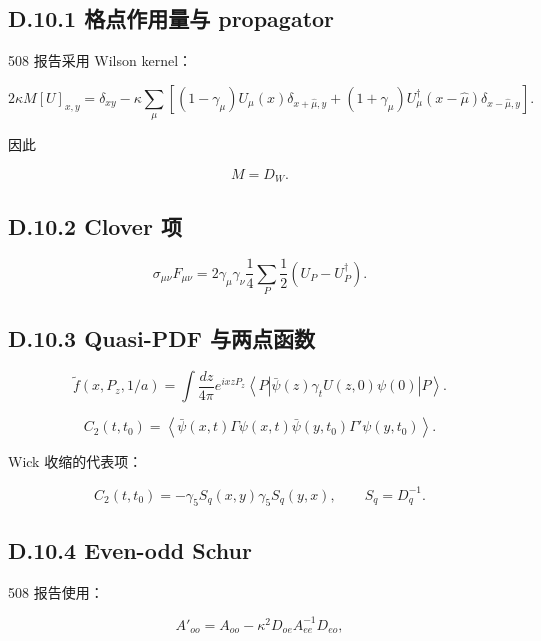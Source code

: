 \documentclass[UTF8,a4paper,10pt]{ctexart}
\begin{document}
\subsection{D.10.1 格点作用量与 propagator}
508 报告采用 Wilson kernel：

\begin{displaymath}
2\kappa M[U]_{x,y} = \delta_{xy} -\kappa\sum_\mu\left[ (1-\gamma_\mu)U_\mu(x)\delta_{x+\hat\mu,y} +(1+\gamma_\mu)U_\mu^\dagger(x-\hat\mu) \delta_{x-\hat\mu,y} \right].
\end{displaymath}

因此

\begin{displaymath}
M=D_W.
\end{displaymath}

\subsection{D.10.2 Clover 项}
\begin{displaymath}
\sigma_{\mu\nu}F_{\mu\nu} = 2\gamma_\mu\gamma_\nu \frac14\sum_P \frac12\left(U_P-U_P^\dagger\right).
\end{displaymath}

\subsection{D.10.3 Quasi-PDF 与两点函数}
\begin{displaymath}
\widetilde f(x,P_z,1/a) = \int\frac{dz}{4\pi} e^{ixzP_z} \left\langle P| \bar\psi(z)\gamma_tU(z,0)\psi(0) |P\right\rangle.
\end{displaymath}

\begin{displaymath}
C_2(t,t_0) = \left\langle \bar\psi(x,t)\Gamma\psi(x,t) \bar\psi(y,t_0)\Gamma'\psi(y,t_0) \right\rangle.
\end{displaymath}

Wick 收缩的代表项：

\begin{displaymath}
C_2(t,t_0) =-\gamma_5S_q(x,y)\gamma_5S_q(y,x), \qquad S_q=D_q^{-1}.
\end{displaymath}

\subsection{D.10.4 Even-odd Schur}
508 报告使用：

\begin{displaymath}
A'_{oo}=A_{oo}-\kappa^2D_{oe}A_{ee}^{-1}D_{eo},
\end{displaymath}
\end{document}
